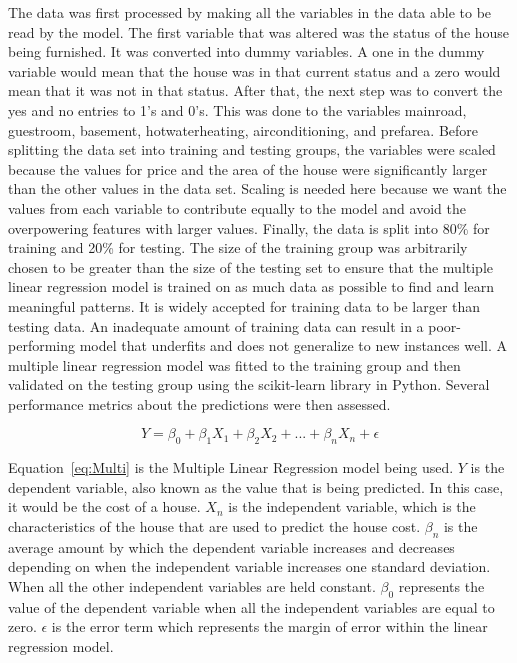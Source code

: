 \documentclass[12pt]{article}
\begin{document}
The data was first processed by making all the variables in the data able to be read by the model. The first variable that was altered was the status of the house being furnished. It was converted into dummy variables. A one in the dummy variable would mean that the house was in that current status and a zero would mean that it was not in that status. After that, the next step was to convert the yes and no entries to 1's and 0's. This was done to the variables mainroad, guestroom, basement, hotwaterheating, airconditioning, and prefarea. Before splitting the data set into training and testing groups, the variables were scaled because the values for price and the area of the house were significantly larger than the other values in the data set. Scaling is needed here because we want the values from each variable to contribute equally to the model and avoid the overpowering features with larger values. Finally, the data is split into \(80\%\) for training and 20\% for testing. The size of the training group was arbitrarily chosen to be greater than the size of the testing set to ensure that the multiple linear regression model is trained on as much data as possible to find and learn meaningful patterns. It is widely accepted for training data to be larger than testing data. An inadequate amount of training data can result in a poor-performing model that underfits and does not generalize to new instances well. A multiple linear regression model was fitted to the training group and then validated on the testing group using the scikit-learn library in Python. Several performance metrics about the predictions were then assessed.


\begin{equation}
  \label{eq:Multi}
  Y = \beta_{0} + \beta_{1}X_{1} + \beta_{2}X_{2} + ... + \beta_{n}X_{n} + \epsilon
\end{equation}

Equation~\ref{eq:Multi} is the Multiple Linear Regression model being used. \(Y\) is the dependent variable, also known as the value that is being predicted. In this case, it would be the cost of a house. \(X_{n}\) is the independent variable, which is the characteristics of the house that are used to predict the house cost. \(\beta_{n}\) is the average amount by which the dependent variable increases and decreases depending on when the independent variable increases one standard deviation. When all the other independent variables are held constant. \(\beta_{0}\) represents the value of the dependent variable when all the independent variables are equal to zero. \(\epsilon\) is the error term which represents the margin of error within the linear regression model. \cite{uyanik2013}
\end{document}
